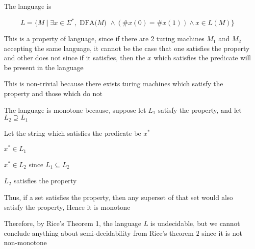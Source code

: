



The language is 

$$
L = \{
    M \mid \exists x \in \Sigma^*, \text{ DFA($M$) } \land
    (\#x(0) = \#x(1)) \land x \in L(M)
\}
$$

This is a property of language, since if there are 2 turing machines $M_1$ and $M_2$ accepting the same language, it cannot be the case that one satisfies the property and other does not since if it satisfies, then the $x$ which satisfies the predicate will be present in the language 

This is non-trivial because there exists turing machines which satisfy the property and those which do not

The language is monotone because, suppose let $L_1$ satisfy the property, and let $L_2 \supseteq L_1$

Let the string which satisfies the predicate be $x^*$

$x^* \in L_1$

\imp
$x^* \in L_2$ since $L_1 \subseteq L_2$

\imp
$L_2$ satisfies the property


Thus, if a set satisfies the property, then any superset of that set would also satisfy the property, Hence it is monotone

Therefore, by Rice's Theorem 1, the language $L$ is undecidable, but we cannot conclude anything about semi-decidability from Rice's theorem 2 since it is not non-monotone





















